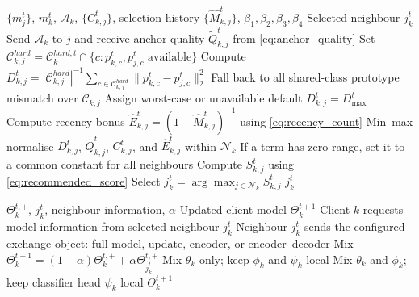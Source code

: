 \documentclass[conference]{IEEEtran}
\begin{document}
\begin{algorithm}[t]
\caption{Task-Aware One-Neighbour Selection at Client $k$}
\label{alg:neighbour_selection}
\footnotesize
\begin{algorithmic}[1]
\REQUIRE $\{m_j^t\}$, $m_k^t$, $\mathcal{A}_k$, $\{C_{k,j}^t\}$, selection history $\{\hat{M}_{k,j}^t\}$, $\beta_1,\beta_2,\beta_3,\beta_4$
\ENSURE Selected neighbour $j_k^t$
    \STATE Send $\mathcal{A}_k$ to $j$ and receive anchor quality $\tilde{Q}_{k,j}^t$ from \eqref{eq:anchor_quality}
    \STATE Set $\mathcal{C}_{k,j}^{hard}=\mathcal{C}_k^{hard,t}\cap\{c:p_{k,c}^{t},p_{j,c}^{t}\text{ available}\}$
        \STATE Compute $D_{k,j}^{t}=|\mathcal{C}_{k,j}^{hard}|^{-1}\sum_{c\in\mathcal{C}_{k,j}^{hard}}\|p_{k,c}^{t}-p_{j,c}^{t}\|_2^2$
    \ELSE
            \STATE Fall back to all shared-class prototype mismatch over $\mathcal{C}_{k,j}$
        \ELSE
            \STATE Assign worst-case or unavailable default $D_{k,j}^{t}=D_{\max}^{t}$
        \ENDIF
    \ENDIF
    \STATE Compute recency bonus $\hat{E}_{k,j}^{t}=(1+\hat{M}_{k,j}^{t})^{-1}$ using \eqref{eq:recency_count}
\ENDFOR
\STATE Min--max normalise $D_{k,j}^t$, $\tilde{Q}_{k,j}^t$, $C_{k,j}^t$, and $\hat{E}_{k,j}^t$ within $\mathcal{N}_k$
\STATE If a term has zero range, set it to a common constant for all neighbours
\STATE Compute $S_{k,j}^{t}$ using \eqref{eq:recommended_score}
\STATE Select $j_k^t=\arg\max_{j\in\mathcal{N}_k}S_{k,j}^{t}$
\RETURN $j_k^t$
\end{algorithmic}
\end{algorithm}

\begin{algorithm}[t]
\caption{Peer Exchange and Model Mixing}
\label{alg:peer_exchange}
\footnotesize
\begin{algorithmic}[1]
\REQUIRE $\Theta_k^{t,+}$, $j_k^t$, neighbour information, $\alpha$
\ENSURE Updated client model $\Theta_k^{t+1}$
\STATE Client $k$ requests model information from selected neighbour $j_k^t$
\STATE Neighbour $j_k^t$ sends the configured exchange object: full model, update, encoder, or encoder--decoder
    \STATE Mix $\Theta_k^{t+1}=(1-\alpha)\Theta_k^{t,+}+\alpha\Theta_{j_k^t}^{t,+}$
    \STATE Mix $\theta_k$ only; keep $\phi_k$ and $\psi_k$ local
\ELSE
    \STATE Mix $\theta_k$ and $\phi_k$; keep classifier head $\psi_k$ local
\ENDIF
\RETURN $\Theta_k^{t+1}$
\end{algorithmic}
\end{algorithm}
\end{document}
